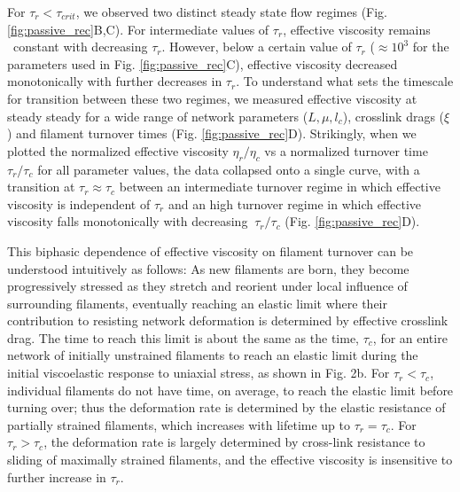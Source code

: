 \documentclass[10pt,letterpaper]{article}
\begin{document}
For $\tau_r < \tau_{crit}$, we observed two distinct steady state flow regimes (Fig. \ref{fig:passive_rec}B,C). For intermediate values of $\tau_r$, effective viscosity remains ~constant with decreasing $\tau_r$.  However, below a certain value of  $\tau_r$ ($\approx 10^3$ for the parameters used in Fig. \ref{fig:passive_rec}C),  effective viscosity decreased monotonically with further decreases in $\tau_r$. To understand what sets the timescale for transition between these two regimes,  we measured effective viscosity at steady steady for a wide range of  network parameters ($L, \mu, {l_c}$), crosslink drags ($\xi$) and filament turnover times (Fig. \ref{fig:passive_rec}D). Strikingly, when we plotted the normalized effective viscosity $\eta_r/\eta_c$ vs a normalized turnover time $\tau_r/\tau_c$ for all parameter values, the data collapsed onto a single curve, with a transition at  $\tau_r \approx \tau_c$  between an intermediate turnover regime in which effective viscosity is independent of $\tau_r$  and an high turnover regime in which effective viscosity falls monotonically with decreasing $~\tau_r/\tau_c$  (Fig. \ref{fig:passive_rec}D). 
 
This biphasic dependence of effective viscosity on filament turnover can be understood intuitively as follows:  As new filaments are born, they become progressively stressed as they stretch and reorient under local influence of surrounding filaments, eventually reaching an elastic limit where their contribution to resisting network deformation is determined by effective crosslink drag.  The time to reach this limit is about the same as the time, $\tau_c$, for an entire network of initially unstrained filaments to reach an elastic limit during the initial viscoelastic response to uniaxial stress, as shown in Fig. 2b.  For $\tau_r < \tau_c$, individual filaments do not have time, on average, to reach the elastic limit before turning over; thus the deformation rate is determined by the elastic resistance of partially strained filaments, which increases with lifetime up to $\tau_r = \tau_c$. For $\tau_r > \tau_c$, the deformation rate is largely determined by cross-link resistance to sliding of maximally strained filaments, and the effective viscosity is insensitive to further increase in  $\tau_r$.
\end{document}
